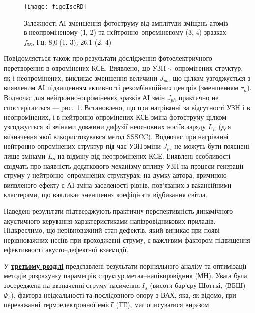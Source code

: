 \begin{figure}[ht]
\center
\texttt{[image: figeIscRD]}
\caption{\label{figeIscRD}
Залежності АІ зменшення фотоструму від
амплітуди зміщень атомів в неопроміненому (1, 2)
та нейтронно--опроміненому (3, 4) зразках.
$f_\mathtt{US}$, Гц: 8,0 (1, 3);
26,1 (2, 4)
}%
\end{figure}
Повідомляється також про результати дослідження фотоелектричного перетворення в опромінених КСЕ.
Виявлено, що УЗН $\gamma$--опромінених структур, як і неопромінених, викликає зменшення величини $J_{ph}$, що цілком
узгоджується з виявленим АІ підвищенням активності рекомбінаційних центрів (зменшенням $\tau_n$).
Водночас для нейтронно-опромінених зразків АІ змін $J_{ph}$ практично не спостерігається --- рис.~\ref{figeIscRD}.
Встановлено, що при нагріванні за відсутності УЗН і в неопромінених, і в нейтронно-опромінених КСЕ зміна фотоструму
цілком узгоджується зі змінами довжини дифузії неосновних носіїв заряду $L_n$ (для визначення якої використовувався метод SSSCC).
Водночас при нагріванні нейтронно-опромінених структур під час УЗН зміни $J_{ph}$ не можуть бути пояснені лише змінами $L_n$ на відміну від неопромінених КСЕ.
Виявлені особливості свідчать про наявність додаткового механізму впливу УЗН на процеси генерації струму у нейтронно--опромінених структурах;
на думку автора, причиною виявленого ефекту є АІ зміна заселеності рівнів, пов'язаних з вакансійними кластерами, що викликає зменшення коефіцієнта відбивання світла.


Наведені   результати  підтверджують  практичну перспективність динамічного акустичного керування характеристиками напівровідникових приладів.
Підкреслимо, що нерівноважний стан дефектів, який виникає при появі нерівноважних носіїв при проходженні струму, є важливим фактором підвищення ефективності акусто--дефектної взаємодії.

У  \underline{\textbf{третьому розділі}} представлені результати поріняльного аналізу та оптимізації методів розрахунку параметрів структур метал--напівпровідник (МН).
Увага була зосереджена на визначенні струму насичення  $I_s$ (висоти бар'єру Шотткі, (ВБШ) $\Phi_b$), фактора неідеальності та послідовного опору з ВАХ, яка, як відомо, при переважанні термоелектронної емісії (ТЕ), має описуватися виразом

